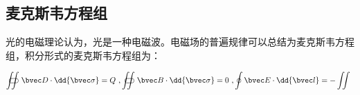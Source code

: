 

\subsection{麦克斯韦方程组}

光的电磁理论认为，光是一种电磁波。电磁场的普遍规律可以总结为麦克斯韦方程组，积分形式的麦克斯韦方程组为：

\begin{equation}
\begin{aligned}
\displaystyle \iint\!\!\!\!\!\!\!\!\!\!\subset\!\supset \bvec D \cdot \dd{\bvec \sigma} = Q ~,
\displaystyle \iint\!\!\!\!\!\!\!\!\!\!\subset\!\supset \bvec B \cdot \dd{\bvec \sigma} = 0 ~,
\oint \bvec E \cdot \dd{\bvec l} = - \iint \frac{}{}
\end{aligned}
\end{equation}
